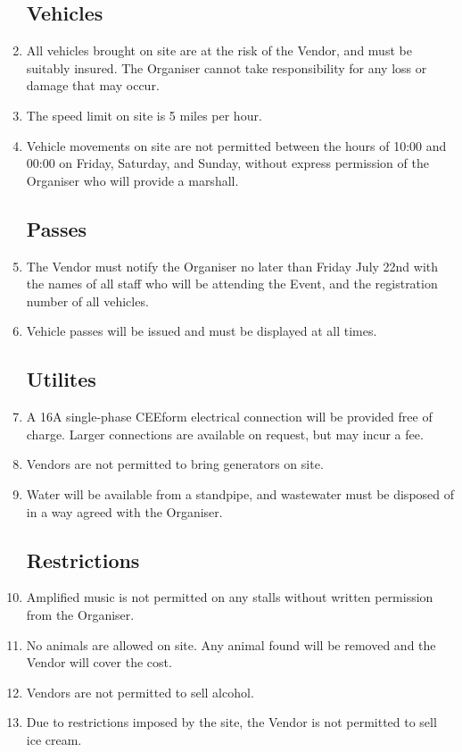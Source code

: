 \begin{enumerate}
\subsection*{Vehicles}
\item All vehicles brought on site are at the risk of the Vendor, and must be suitably insured.
        The Organiser cannot take responsibility for any loss or damage that may occur.
\item The speed limit on site is 5 miles per hour.
\item Vehicle movements on site are not permitted between the hours of 10:00 and 00:00 on
      Friday, Saturday, and Sunday, without express permission of the Organiser who will provide
      a marshall.

\subsection*{Passes}
\item The Vendor must notify the Organiser no later than Friday July 22nd with the names of
        all staff who will be attending the Event, and the registration number of all vehicles.
\item Vehicle passes will be issued and must be displayed at all times.

\subsection*{Utilites}
\item A 16A single-phase CEEform electrical connection will be provided free of charge. Larger
        connections are available on request, but may incur a fee.
\item Vendors are not permitted to bring generators on site.
\item Water will be available from a standpipe, and wastewater must be disposed of in a way
        agreed with the Organiser.

\subsection*{Restrictions}
\item Amplified music is not permitted on any stalls without written permission from the Organiser.
\item No animals are allowed on site. Any animal found will be removed and the Vendor will
        cover the cost.
\item Vendors are not permitted to sell alcohol.
\item Due to restrictions imposed by the site, the Vendor is not permitted to sell ice cream.


\end{enumerate}
